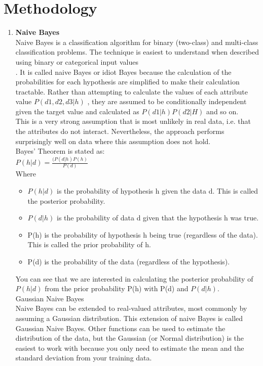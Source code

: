 \documentclass[a4paper, 11pt, oneside]{article} %
\begin{document}
\section{Methodology}
\begin {enumerate}
\item \textbf {Naive Bayes} \\
 Naive Bayes is a classification algorithm for binary (two-class) and multi-class classification problems. The technique is easiest to understand when described using binary or categorical input values\\.
It is called naive Bayes or idiot Bayes because the calculation of the probabilities for each hypothesis are simplified to make their calculation tractable. Rather than attempting to calculate the values of each attribute value $P(d1, d2, d3|h)$ , they are assumed to be conditionally independent given the target value and calculated as $P(d1|h)P(d2|H)$ and so on.\\
This is a very strong assumption that is most unlikely in real data, i.e. that the attributes do not interact. Nevertheless, the approach performs surprisingly well on data where this assumption does not hold.\cite{analyticsvidhya2} \\
Bayes’ Theorem is stated as: 
\\
$P(h|d) = \frac { (P(d|h)P(h)}{P(d)}$\\
Where\\
\begin{itemize}
\item$P(h|d)$ is the probability of hypothesis h given the data d. This is called the posterior probability.
\item$P(d|h)$ is the probability of data d given that the hypothesis h was true.
\item P(h) is the probability of hypothesis h being true (regardless of the data). This is called the prior probability of h.
\item P(d) is the probability of the data (regardless of the hypothesis).
\end{itemize}
You can see that we are interested in calculating the posterior probability of $P(h|d)$ from the prior probability P(h) with P(d) and $P(d|h)$.\\

Gaussian Naive Bayes\\
Naive Bayes can be extended to real-valued attributes, most commonly by assuming a Gaussian distribution.
This extension of naive Bayes is called Gaussian Naive Bayes. Other functions can be used to estimate the distribution of the data, but the Gaussian (or Normal distribution) is the easiest to work with because you only need to estimate the mean and the standard deviation from your training data.\\


\end{enumerate}
\end{document}
